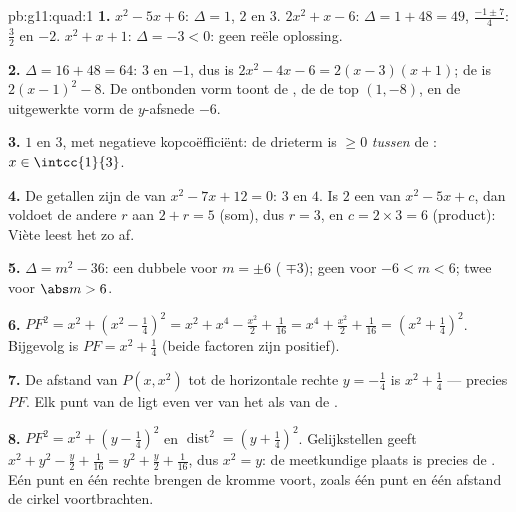 \begin{solution}{pb:g11:quad:1}
\textbf{1.} $x^2 - 5x + 6$: $\Delta = 1$,  $2$ en $3$.
$2x^2 + x - 6$: $\Delta = 1 + 48 = 49$,  $\frac{-1 \pm 7}{4}$:
$\frac32$ en $-2$. $x^2 + x + 1$: $\Delta = -3 < 0$: geen reële oplossing.

\textbf{2.} $\Delta = 16 + 48 = 64$:  $3$ en $-1$, dus is
$2x^2 - 4x - 6 = 2(x - 3)(x + 1)$; de  is $2(x - 1)^2 - 8$. De
ontbonden vorm toont de , de  de top $(1, -8)$, en de
uitgewerkte vorm de $y$-afsnede $-6$.

\textbf{3.}  $1$ en $3$, met negatieve kopcoëfficiënt: de drieterm is
$\geq 0$ \emph{tussen} de : $x \in \intcc{1}{3}$.

\textbf{4.} De getallen zijn de  van $x^2 - 7x + 12 = 0$: $3$ en $4$.
Is $2$ een  van $x^2 - 5x + c$, dan voldoet de andere  $r$ aan
$2 + r = 5$ (som), dus $r = 3$, en $c = 2 \times 3 = 6$ (product): Viète
leest het zo af.

\textbf{5.} $\Delta = m^2 - 36$: een dubbele  voor $m = \pm 6$ (
$\mp 3$); geen  voor $-6 < m < 6$; twee  voor $\abs m > 6$.

\textbf{6.} $PF^2 = x^2 + \left(x^2 - \frac14\right)^2
= x^2 + x^4 - \frac{x^2}{2} + \frac{1}{16}
= x^4 + \frac{x^2}{2} + \frac{1}{16}
= \left(x^2 + \frac14\right)^2$. Bijgevolg is $PF = x^2 + \frac14$ (beide
factoren zijn positief).

\textbf{7.} De afstand van $P(x, x^2)$ tot de horizontale rechte
$y = -\frac14$ is $x^2 + \frac14$ --- precies $PF$. Elk punt van de 
ligt even ver van het  als van de .

\textbf{8.} $PF^2 = x^2 + \left(y - \frac14\right)^2$ en
$\operatorname{dist}^2 = \left(y + \frac14\right)^2$. Gelijkstellen geeft
$x^2 + y^2 - \frac y2 + \frac{1}{16} = y^2 + \frac y2 + \frac1{16}$, dus
$x^2 = y$: de meetkundige plaats is precies de . Eén punt en één
rechte brengen de kromme voort, zoals één punt en één afstand de cirkel
voortbrachten.


\end{solution}
